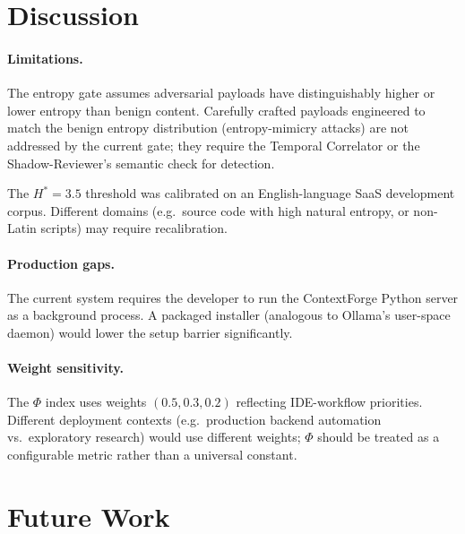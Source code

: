 \documentclass[11pt]{article}
\begin{document}
\section{Discussion}
\label{sec:discussion}

\paragraph{Limitations.}
The entropy gate assumes adversarial payloads have distinguishably higher
or lower entropy than benign content. Carefully crafted payloads engineered
to match the benign entropy distribution (entropy-mimicry attacks) are not
addressed by the current gate; they require the Temporal Correlator or the
Shadow-Reviewer's semantic check for detection.

The $H^{*} = 3.5$ threshold was calibrated on an English-language SaaS
development corpus. Different domains (e.g.\ source code with high natural
entropy, or non-Latin scripts) may require recalibration.

\paragraph{Production gaps.}
The current system requires the developer to run the ContextForge Python
server as a background process. A packaged installer (analogous to Ollama's
user-space daemon) would lower the setup barrier significantly.

\paragraph{Weight sensitivity.}
The $\Phi$ index uses weights $(0.5, 0.3, 0.2)$ reflecting IDE-workflow
priorities. Different deployment contexts (e.g.\ production backend automation
vs.\ exploratory research) would use different weights; $\Phi$ should be
treated as a configurable metric rather than a universal constant.

\section{Future Work}
\label{sec:future}
\end{document}
